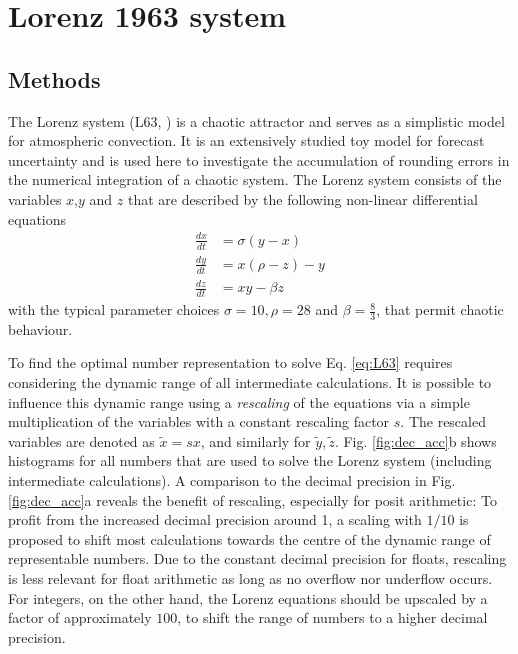 \documentclass[draft]{agujournal2019}
\begin{document}
\section{Lorenz 1963 system}
\label{sec:L63}

\subsection{Methods}
\label{sec:L63_methods}

The Lorenz system (L63, \cite{Lorenz1963}) is a chaotic attractor and serves as a simplistic model for atmospheric convection. It is an extensively studied toy model for forecast uncertainty \cite{Lorenz1963,Kwasniok2014,Jeffress2017,Tantet2018} and is used here to investigate the accumulation of rounding errors in the numerical integration of a chaotic system. The Lorenz system consists of the variables $x$,$y$ and $z$ that are described by the following non-linear differential equations
\begin{subequations}
\begin{align}
\frac{dx}{dt} &= \sigma(y-x) \\
\frac{dy}{dt} &= x(\rho - z) - y \\
\frac{dz}{dt} &= xy - \beta z
\end{align}
\label{eq:L63}%
\end{subequations}
with the typical parameter choices $\sigma = 10, \rho = 28$ and $\beta = \tfrac{8}{3}$, that permit chaotic behaviour. 

To find the optimal number representation to solve Eq. \ref{eq:L63} requires considering the dynamic range of all intermediate calculations. It is possible to influence this dynamic range using a \emph{rescaling} of the equations via a simple multiplication of the variables with a constant rescaling factor $s$. The rescaled variables are denoted as $\tilde{x} = sx$, and similarly for $\tilde{y},\tilde{z}$. Fig. \ref{fig:dec_acc}b shows histograms for all numbers that are used to solve the Lorenz system (including intermediate calculations). A comparison to the decimal precision in Fig. \ref{fig:dec_acc}a reveals the benefit of rescaling, especially for posit arithmetic: To profit from the increased decimal precision around 1, a scaling with $1/10$ is proposed to shift most calculations towards the centre of the dynamic range of representable numbers. Due to the constant decimal precision for floats, rescaling is less relevant for float arithmetic as long as no overflow nor underflow occurs. For integers, on the other hand, the Lorenz equations should be upscaled by a factor of approximately $100$, to shift the range of numbers to a higher decimal precision.
\end{document}
